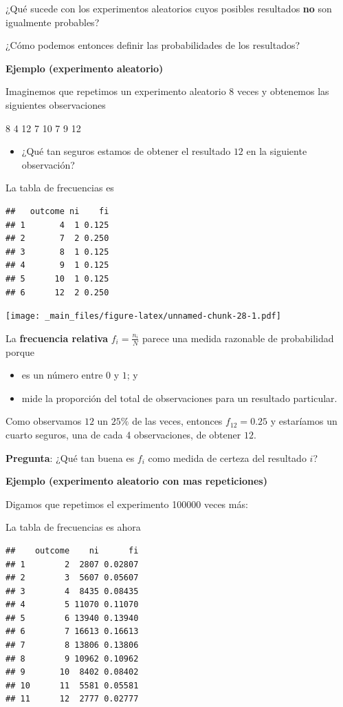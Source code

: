 \documentclass[
]{book}
\providecommand{\tightlist}{%
  \setlength{\itemsep}{0pt}\setlength{\parskip}{0pt}}
\begin{document}
¿Qué sucede con los experimentos aleatorios cuyos posibles resultados \textbf{no} son igualmente probables?

¿Cómo podemos entonces definir las probabilidades de los resultados?

\textbf{Ejemplo (experimento aleatorio)}

Imaginemos que repetimos un experimento aleatorio \(8\) veces y obtenemos las siguientes observaciones

8 4 12 7 10 7 9 12

\begin{itemize}
\tightlist
\item
  ¿Qué tan seguros estamos de obtener el resultado \(12\) en la siguiente observación?
\end{itemize}

La tabla de frecuencias es

\begin{verbatim}
##   outcome ni    fi
## 1       4  1 0.125
## 2       7  2 0.250
## 3       8  1 0.125
## 4       9  1 0.125
## 5      10  1 0.125
## 6      12  2 0.250
\end{verbatim}

\texttt{[image: \_main\_files/figure-latex/unnamed-chunk-28-1.pdf]}

La \textbf{frecuencia relativa} \(f_i=\frac{n_i}{N}\) parece una medida razonable de probabilidad porque

\begin{itemize}
\tightlist
\item
  es un número entre \(0\) y \(1\); y
\item
  mide la proporción del total de observaciones para un resultado particular.
\end{itemize}

Como observamos \(12\) un \(25\%\) de las veces, entonces \(f_{12}=0.25\) y estaríamos un cuarto seguros, una de cada 4 observaciones, de obtener \(12\).

\textbf{Pregunta}: ¿Qué tan buena es \(f_i\) como medida de certeza del resultado \(i\)?

\textbf{Ejemplo (experimento aleatorio con mas repeticiones)}

Digamos que repetimos el experimento 100000 veces más:

La tabla de frecuencias es ahora

\begin{verbatim}
##    outcome    ni      fi
## 1        2  2807 0.02807
## 2        3  5607 0.05607
## 3        4  8435 0.08435
## 4        5 11070 0.11070
## 5        6 13940 0.13940
## 6        7 16613 0.16613
## 7        8 13806 0.13806
## 8        9 10962 0.10962
## 9       10  8402 0.08402
## 10      11  5581 0.05581
## 11      12  2777 0.02777
\end{verbatim}
\end{document}
